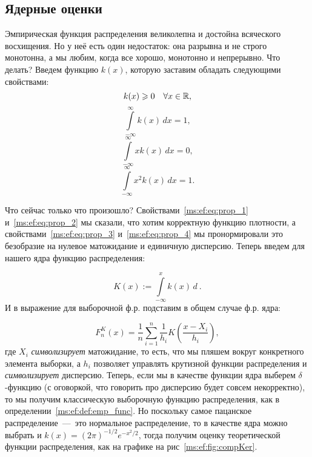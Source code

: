 \documentclass[../TV&MS.tex]{subfiles}
\begin{document}
\subsection{Ядерные оценки}

Эмпирическая функция распределения великолепна и достойна всяческого восхищения.
Но у неё есть один недостаток: она разрывна и не строго монотонна, а мы любим, когда все хорошо, монотонно и непрерывно. 
Что делать?
Введем функцию $k(x)$, которую заставим обладать следующими свойствами:
\begin{equation}\label{ms:ef:eq:prop_1}
    k(x) \geqslant 0 \quad \forall x \in \mathbb{R},
\end{equation}
\begin{equation}\label{ms:ef:eq:prop_2}
    \int\limits_{-\infty}^{\infty} k(x)\,dx = 1,
\end{equation}
\begin{equation}\label{ms:ef:eq:prop_3}
    \int\limits_{-\infty}^{\infty} xk(x)\,dx = 0,
\end{equation} 
\begin{equation}\label{ms:ef:eq:prop_4}
    \int\limits_{-\infty}^{\infty} x^2k(x)\,dx = 1
.\end{equation} 

Что сейчас только что произошло? 
Свойствами~\eqref{ms:ef:eq:prop_1} и~\eqref{ms:ef:eq:prop_2}
мы сказали, что хотим корректную функцию плотности,
а свойствами~\eqref{ms:ef:eq:prop_3} и~\eqref{ms:ef:eq:prop_4}
мы пронормировали это безобразие на нулевое матожидание и единичную дисперсию.
Теперь введем для нашего ядра функцию распределения:

\begin{equation}
    K(x) := \int\limits_{-\infty}^{x} k(x)\,d~
.\end{equation}
И в выражение для выборочной ф.р. подставим в общем случае ф.р. ядра:

\begin{equation}
    F_{n}^{K}(x) = \frac{1}{n}\sum\limits_{i=1}^{n} \frac{1}{h_i} K\left(\frac{x - X_{i}}{h_i}\right)
,\end{equation} 
где $X_i$ \textit{символизирует} матожидание, то есть, что мы пляшем вокруг
конкретного элемента выборки, а $h_i$ позволяет управлять крутизной
функции распределения и \textit{символизирует} дисперсию.
Теперь, если мы в качестве функции ядра выберем $\delta$-функцию
(с оговоркой, что говорить про дисперсию будет совсем некорректно), 
то мы получим классическую выборочную функцию распределения,
как в определении~\ref{ms:ef:def:emp_func}.
Но поскольку самое пацанское распределение~---~это нормальное распределение,
то в качестве ядра можно выбрать и $k(x) = (2\pi)^{-1\!/2}e^{-x^2\!/2}$, тогда получим
оценку теоретической функции распределения, как на графике на рис~\ref{ms:ef:fig:compKer}. 
\end{document}
